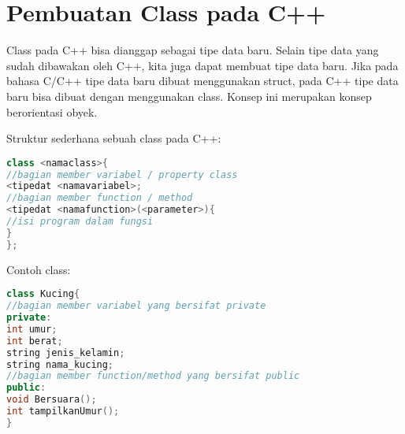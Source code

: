 \section{Pembuatan Class pada C++}\label{pembuatan-class-pada-c}

Class pada C++ bisa dianggap sebagai tipe data baru. Selain tipe data
yang sudah dibawakan oleh C++, kita juga dapat membuat tipe data baru.
Jika pada bahasa C/C++ tipe data baru dibuat menggunakan struct, pada
C++ tipe data baru bisa dibuat dengan menggunakan class. Konsep ini
merupakan konsep berorientasi obyek.

Struktur sederhana sebuah class pada C++:

\begin{lstlisting}[language=c++, numbers=none]
class <namaclass>{
//bagian member variabel / property class
<tipedat <namavariabel>;
//bagian member function / method
<tipedat <namafunction>(<parameter>){
//isi program dalam fungsi
}
};
\end{lstlisting}

Contoh class:

\begin{lstlisting}[language=c++, numbers=none]
class Kucing{
//bagian member variabel yang bersifat private
private:
int umur;
int berat;
string jenis_kelamin;
string nama_kucing;
//bagian member function/method yang bersifat public
public:
void Bersuara();
int tampilkanUmur();
}
\end{lstlisting}

